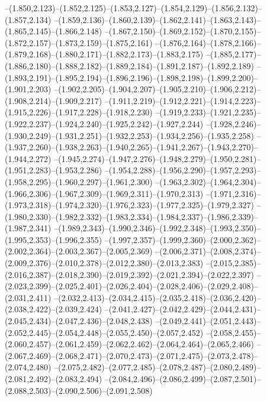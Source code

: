   --(1.850,2.123)--(1.852,2.125)--(1.853,2.127)--(1.854,2.129)--(1.856,2.132)--(1.857,2.134)%
  --(1.859,2.136)--(1.860,2.139)--(1.862,2.141)--(1.863,2.143)--(1.865,2.145)--(1.866,2.148)%
  --(1.867,2.150)--(1.869,2.152)--(1.870,2.155)--(1.872,2.157)--(1.873,2.159)--(1.875,2.161)%
  --(1.876,2.164)--(1.878,2.166)--(1.879,2.168)--(1.880,2.171)--(1.882,2.173)--(1.883,2.175)%
  --(1.885,2.177)--(1.886,2.180)--(1.888,2.182)--(1.889,2.184)--(1.891,2.187)--(1.892,2.189)%
  --(1.893,2.191)--(1.895,2.194)--(1.896,2.196)--(1.898,2.198)--(1.899,2.200)--(1.901,2.203)%
  --(1.902,2.205)--(1.904,2.207)--(1.905,2.210)--(1.906,2.212)--(1.908,2.214)--(1.909,2.217)%
  --(1.911,2.219)--(1.912,2.221)--(1.914,2.223)--(1.915,2.226)--(1.917,2.228)--(1.918,2.230)%
  --(1.919,2.233)--(1.921,2.235)--(1.922,2.237)--(1.924,2.240)--(1.925,2.242)--(1.927,2.244)%
  --(1.928,2.246)--(1.930,2.249)--(1.931,2.251)--(1.932,2.253)--(1.934,2.256)--(1.935,2.258)%
  --(1.937,2.260)--(1.938,2.263)--(1.940,2.265)--(1.941,2.267)--(1.943,2.270)--(1.944,2.272)%
  --(1.945,2.274)--(1.947,2.276)--(1.948,2.279)--(1.950,2.281)--(1.951,2.283)--(1.953,2.286)%
  --(1.954,2.288)--(1.956,2.290)--(1.957,2.293)--(1.958,2.295)--(1.960,2.297)--(1.961,2.300)%
  --(1.963,2.302)--(1.964,2.304)--(1.966,2.306)--(1.967,2.309)--(1.969,2.311)--(1.970,2.313)%
  --(1.971,2.316)--(1.973,2.318)--(1.974,2.320)--(1.976,2.323)--(1.977,2.325)--(1.979,2.327)%
  --(1.980,2.330)--(1.982,2.332)--(1.983,2.334)--(1.984,2.337)--(1.986,2.339)--(1.987,2.341)%
  --(1.989,2.343)--(1.990,2.346)--(1.992,2.348)--(1.993,2.350)--(1.995,2.353)--(1.996,2.355)%
  --(1.997,2.357)--(1.999,2.360)--(2.000,2.362)--(2.002,2.364)--(2.003,2.367)--(2.005,2.369)%
  --(2.006,2.371)--(2.008,2.374)--(2.009,2.376)--(2.010,2.378)--(2.012,2.380)--(2.013,2.383)%
  --(2.015,2.385)--(2.016,2.387)--(2.018,2.390)--(2.019,2.392)--(2.021,2.394)--(2.022,2.397)%
  --(2.023,2.399)--(2.025,2.401)--(2.026,2.404)--(2.028,2.406)--(2.029,2.408)--(2.031,2.411)%
  --(2.032,2.413)--(2.034,2.415)--(2.035,2.418)--(2.036,2.420)--(2.038,2.422)--(2.039,2.424)%
  --(2.041,2.427)--(2.042,2.429)--(2.044,2.431)--(2.045,2.434)--(2.047,2.436)--(2.048,2.438)%
  --(2.049,2.441)--(2.051,2.443)--(2.052,2.445)--(2.054,2.448)--(2.055,2.450)--(2.057,2.452)%
  --(2.058,2.455)--(2.060,2.457)--(2.061,2.459)--(2.062,2.462)--(2.064,2.464)--(2.065,2.466)%
  --(2.067,2.469)--(2.068,2.471)--(2.070,2.473)--(2.071,2.475)--(2.073,2.478)--(2.074,2.480)%
  --(2.075,2.482)--(2.077,2.485)--(2.078,2.487)--(2.080,2.489)--(2.081,2.492)--(2.083,2.494)%
  --(2.084,2.496)--(2.086,2.499)--(2.087,2.501)--(2.088,2.503)--(2.090,2.506)--(2.091,2.508)%
